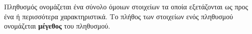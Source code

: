 Πληθυσμός ονομάζεται ένα σύνολο όμοιων στοιχείων τα οποία εξετάζονται ως προς ένα ή περισσότερα χαρακτηριστικά. Το πλήθος των στοιχείων ενός πληθυσμού ονομάζεται \textbf{μέγεθος} του πληθυσμού.
